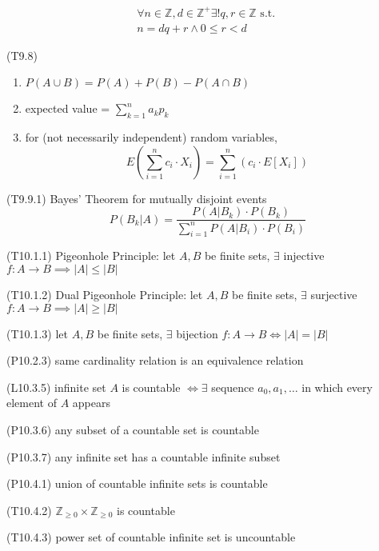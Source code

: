 \documentclass[landscape, a4paper]{article}
\let\leq\leqslant
\let\geq\geqslant
\newcommand{\Z}{\mathbb{Z}}
\renewcommand{\and}{\wedge}
\begin{document}
\begin{multicols*}{4}
\begin{description}[leftmargin=4pt]
              \begin{multline*}
                  \forall n\in\Z, d\in\Z^+ \exists !q,r\in\Z \text{ s.t. } \\
                  n=dq+r \and 0\leq r < d
              \end{multline*}
        \item (T9.8)
              \begin{enumerate}
                  \item $P(A\cup B)=P(A)+P(B)-P(A\cap B)$
                  \item expected value = $\sum_{k=1}^na_kp_k$
                  \item for (not necessarily independent) random variables,
                        \[
                            E\left(\sum_{i=1}^nc_i\cdot X_i\right)=\sum_{i=1}^n(c_i\cdot E[X_i])
                        \]
              \end{enumerate}
        \item (T9.9.1) Bayes' Theorem for mutually disjoint events
              \[
                  P(B_k|A)=\dfrac{P(A|B_k)\cdot P(B_k)}{\sum_{i=1}^nP(A|B_i)\cdot P(B_i)}
              \]
        \item (T10.1.1) Pigeonhole Principle: let $A,B$ be finite sets, $\exists$ injective $f: A\rightarrow B\implies |A|\leq |B|$
        \item (T10.1.2) Dual Pigeonhole Principle: let $A,B$ be finite sets, $\exists$ surjective $f: A\rightarrow B\implies |A|\geq |B|$
        \item (T10.1.3) let $A,B$ be finite sets, $\exists$ bijection $f:A\rightarrow B \iff |A|=|B|$
        \item (P10.2.3) same cardinality relation is an equivalence relation
        \item (L10.3.5) infinite set $A$ is countable $\iff \exists$ sequence $a_0, a_1, \hdots$ in which every element of $A$ appears
        \item (P10.3.6) any subset of a countable set is countable
        \item (P10.3.7) any infinite set has a countable infinite subset
        \item (P10.4.1) union of countable infinite sets is countable
        \item (T10.4.2) $\Z_{\geq 0} \times \Z_{\geq 0}$ is countable
        \item (T10.4.3) power set of countable infinite set is uncountable
    \end{description}


\end{multicols*}
\end{document}
